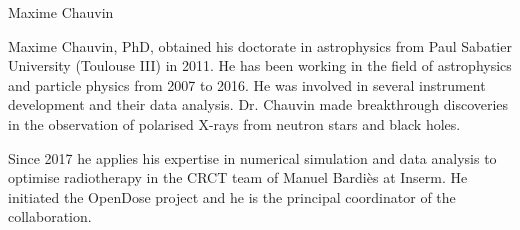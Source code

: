 \begin{participant}[type=R,PM=24,gender=male]{Maxime Chauvin}






  Maxime Chauvin, PhD, obtained his doctorate in astrophysics from Paul
  Sabatier University (Toulouse III) in 2011. He has been working in the field
  of astrophysics and particle physics from 2007 to 2016. He was involved in
  several instrument development and their data analysis. Dr.  Chauvin made
  breakthrough discoveries in the observation of polarised X-rays from neutron
  stars and black holes.
  
  Since 2017 he applies his expertise in numerical simulation and data analysis
  to optimise radiotherapy in the CRCT team of Manuel Bardi\`es at Inserm. He
  initiated the OpenDose project and he is the principal coordinator of the
  collaboration.

\end{participant}

